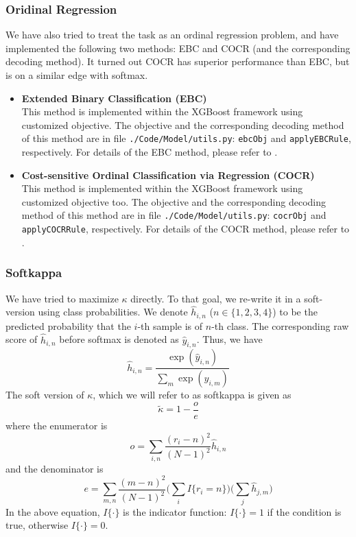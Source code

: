 \documentclass[12pt]{article}
\begin{document}
\subsubsection{Oridinal Regression}
We have also tried to treat the task as an ordinal regression problem, and have implemented the following two methods: EBC and COCR (and the corresponding decoding method). It turned out COCR has superior performance than EBC, but is on a similar edge with softmax.
\begin{itemize}
\item \textbf{Extended Binary Classification (EBC)}\\
This method is implemented within the XGBoost framework using customized objective. The objective and the corresponding decoding method of this method are in file \texttt{./Code/Model/utils.py}: \texttt{ebcObj} and \texttt{applyEBCRule}, respectively. For details of the EBC method, please refer to \cite{ebc}.
\item \textbf{Cost-sensitive Ordinal Classification via Regression (COCR)}\\
This method is implemented within the XGBoost framework using customized objective too. The objective and the corresponding decoding method of this method are in file \texttt{./Code/Model/utils.py}: \texttt{cocrObj} and \texttt{applyCOCRRule}, respectively. For details of the COCR method, please refer to \cite{cocr}.
\end{itemize}

\subsubsection{Softkappa}
We have tried to maximize $\kappa$ directly. To that goal, we re-write it in a soft-version using class probabilities. We denote $\hat{h}_{i,n}$ ($n\in{\{1,2,3,4\}}$) to be the predicted probability that the $i$-th sample is of $n$-th class. The corresponding raw score of $\hat{h}_{i,n}$ before softmax is denoted as $\hat{y}_{i,n}$. Thus, we have
\begin{equation}
\hat{h}_{i,n}=\frac{\exp(\hat{y}_{i,n})}{\sum_{m}\exp(\hat{y}_{i,m})}
\end{equation}
The soft version of $\kappa$, which we will refer to as softkappa is given as
\begin{equation}
\tilde{\kappa} = 1 - \frac{o}{e}
\end{equation}
where the enumerator is
\begin{equation}
o = \sum_{i,n} \frac{(r_i - n)^2}{(N-1)^2}\hat{h}_{i,n}
\end{equation}
and the denominator is
\begin{equation}
e = \sum_{m,n} \frac{(m - n)^2}{(N-1)^2} \big(\sum_i I\{r_i = n\}\big) \big(\sum_j \hat{h}_{j,m}\big)
\end{equation}
In the above equation, $I\{\cdot\}$ is the indicator function: $I\{\cdot\}=1$ if the condition is true, otherwise $I\{\cdot\}=0$.
\end{document}
